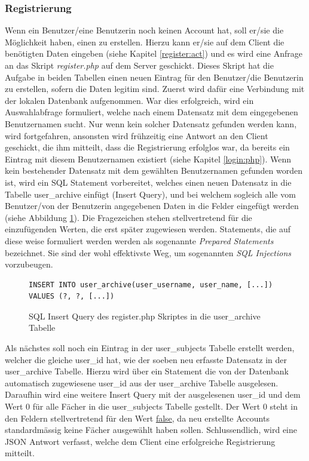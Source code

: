 \documentclass[a4paper,11pt]{report}
\begin{document}
					\subsubsection{Registrierung}%
					Wenn ein Benutzer/eine Benutzerin noch keinen Account hat, soll er/sie die Möglichkeit haben, einen zu erstellen. Hierzu kann er/sie auf dem Client die benötigten Daten eingeben (siehe Kapitel \ref{register:act}) und es wird eine Anfrage an das Skript \emph{register.php} auf dem Server geschickt. Dieses Skript hat die Aufgabe in beiden Tabellen einen neuen Eintrag für den Benutzer/die Benutzerin zu erstellen, sofern die Daten legitim sind. Zuerst wird dafür eine Verbindung mit der lokalen Datenbank aufgenommen. War dies erfolgreich, wird ein Auswahlabfrage formuliert, welche nach einem Datensatz mit dem eingegebenen Benutzernamen sucht. Nur wenn kein solcher Datensatz gefunden werden kann, wird fortgefahren, ansonsten wird frühzeitig eine Antwort an den Client geschickt, die ihm mitteilt, dass die Registrierung erfolglos war, da bereits ein Eintrag mit diesem Benutzernamen existiert (siehe Kapitel \ref{login:php}). Wenn kein bestehender Datensatz mit dem gewählten Benutzernamen gefunden worden ist, wird ein SQL Statement vorbereitet, welches einen neuen Datensatz in die Tabelle user\_archive einfügt (Insert Query), und bei welchem sogleich alle vom Benutzer/von der Benutzerin angegebenen Daten in die Felder eingefügt werden (siehe Abbildung \ref{SQL:INSERT}). Die Fragezeichen stehen stellvertretend für die einzufügenden Werten, die erst später zugewiesen werden. Statements, die auf diese weise formuliert werden werden als sogenannte \emph{Prepared Statements} bezeichnet. Sie sind der wohl effektivste Weg, um sogenannten \emph{SQL Injections} vorzubeugen.\cite{preparedstatement}
				\begin{figure} 
					\begin{center}
					\begin{verbatim}
INSERT INTO user_archive(user_username, user_name, [...]) VALUES (?, ?, [...])
					\end{verbatim}
					\caption{SQL Insert Query des register.php Skriptes in die user\_archive Tabelle}
					\label{SQL:INSERT}
				\end{center}
				\end{figure}	
					Als nächstes soll noch ein Eintrag in der user\_subjects Tabelle erstellt werden, welcher die gleiche user\_id hat, wie der soeben neu erfasste Datensatz in der user\_archive Tabelle. Hierzu wird über ein Statement die von der Datenbank automatisch zugewiesene user\_id aus der user\_archive Tabelle ausgelesen. Daraufhin wird eine weitere Insert Query mit der ausgelesenen user\_id und dem Wert 0 für alle Fächer in die user\_subjects Tabelle gestellt. Der Wert 0 steht in den Feldern stellvertretend für den Wert \url{false}, da neu erstellte Accounts standardmässig keine Fächer ausgewählt haben sollen. Schlussendlich, wird eine JSON Antwort verfasst, welche dem Client eine erfolgreiche Registrierung mitteilt.
					
\end{document}
